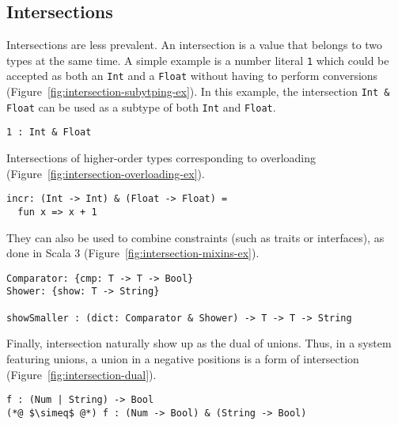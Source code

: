 \documentclass[sigplan,10pt,review,anonymous]{acmart}
\newcommand{\nickel}[1]{\lstinline[language=nickel]{#1}}
\begin{document}
\subsection*{Intersections}

Intersections are less prevalent. An intersection is a value that belongs to
two types at the same time. A simple example is a number literal \nickel{1}
which could be accepted as both an \nickel{Int} and a \nickel{Float} without
having to perform conversions (Figure~\ref{fig:intersection-subytping-ex}). In
this example, the intersection \nickel{Int & Float} can be used as a subtype of
both \nickel{Int} and \nickel{Float}.

\label{fig:intersection-subytping-ex}
\begin{lstlisting}[title={Value subtyping}]
1 : Int & Float
\end{lstlisting}

Intersections of higher-order types corresponding to overloading
(Figure~\ref{fig:intersection-overloading-ex}).

\label{fig:intersection-overloading-ex}
\begin{lstlisting}[title={Overloading}]
incr: (Int -> Int) & (Float -> Float) =
  fun x => x + 1
\end{lstlisting}

They can also be used to combine constraints (such as traits or interfaces), as
done in Scala 3 (Figure~\ref{fig:intersection-mixins-ex}).

\label{fig:intersection-mixins-ex}
\begin{lstlisting}[title={Structural mixins}]
Comparator: {cmp: T -> T -> Bool}
Shower: {show: T -> String}

showSmaller : (dict: Comparator & Shower) -> T -> T -> String
\end{lstlisting}

Finally, intersection naturally show up as the dual of unions. Thus, in a system
featuring unions, a union in a negative positions is a form of intersection
(Figure~\ref{fig:intersection-dual}).

\label{fig:intersection-dual}
\begin{lstlisting}[title={Intersection as the dual of unions}]
f : (Num | String) -> Bool
(*@ $\simeq$ @*) f : (Num -> Bool) & (String -> Bool)
\end{lstlisting}

\end{document}
